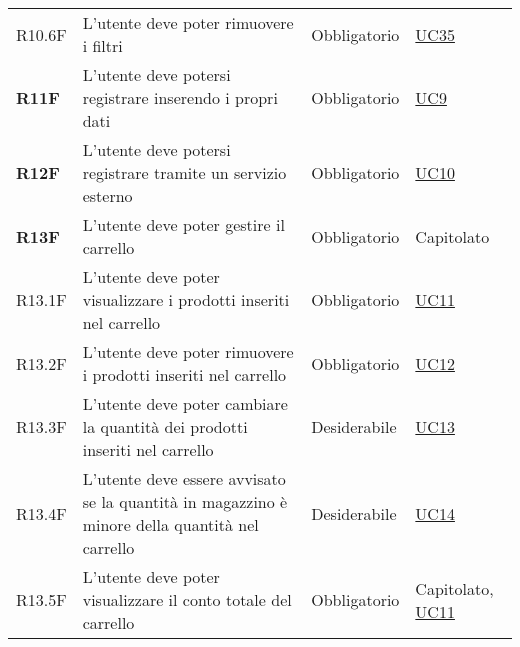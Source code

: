 \begin{center}
\begin{longtable}[!h]{p{50px} p{245px} p{75px} p{50px}}
        R10.6F                                & L'utente deve poter rimuovere i filtri                                                                                                              & Obbligatorio             & \hyperref[sec:UC35]{UC35}                      \\
        \textbf{R11F}                         & L'utente deve potersi registrare inserendo i propri dati                                                                                            & Obbligatorio             & \hyperref[sec:UC9]{UC9}                        \\
        \textbf{R12F}                         & L'utente deve potersi registrare tramite un servizio esterno                                                                                        & Obbligatorio             & \hyperref[sec:UC10]{UC10}                      \\
        \textbf{R13F}                         & L'utente deve poter gestire il carrello                                                                                                             & Obbligatorio             & Capitolato                                     \\
        R13.1F                                & L'utente deve poter visualizzare i prodotti inseriti nel carrello                                                                                   & Obbligatorio             & \hyperref[sec:UC11]{UC11}                      \\
        R13.2F                                & L'utente deve poter rimuovere i prodotti inseriti nel carrello                                                                                      & Obbligatorio             & \hyperref[sec:UC12]{UC12}                      \\
        R13.3F                                & L'utente deve poter cambiare la quantità dei prodotti inseriti nel carrello                                                                         & Desiderabile             & \hyperref[sec:UC13]{UC13}                      \\
        R13.4F                                & L'utente deve essere avvisato se la quantità in magazzino è minore della quantità nel carrello                                                      & Desiderabile             & \hyperref[sec:UC14]{UC14}                      \\
        R13.5F                                & L'utente deve poter visualizzare il conto totale del carrello                                                                                       & Obbligatorio             & Capitolato, \newline \hyperref[sec:UC11]{UC11} \\

\end{longtable}
\end{center}
